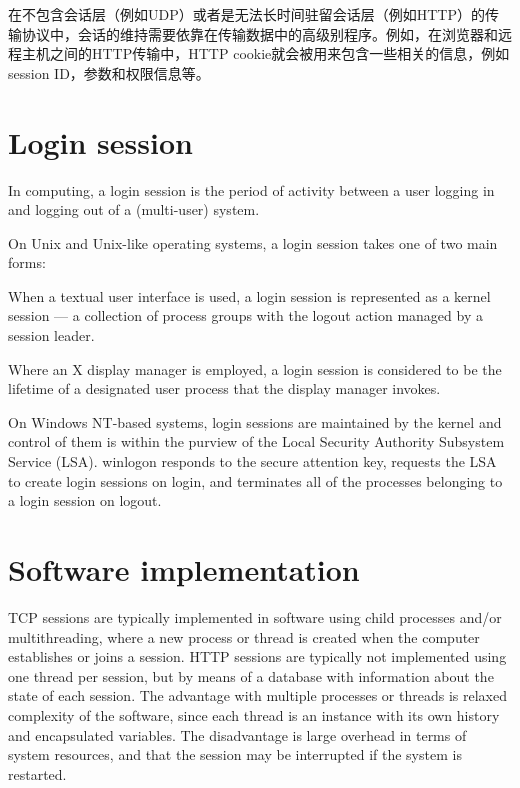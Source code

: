 在不包含会话层（例如UDP）或者是无法长时间驻留会话层（例如HTTP）的传输协议中，会话的维持需要依靠在传输数据中的高级别程序。例如，在浏览器和远程主机之间的HTTP传输中，HTTP cookie就会被用来包含一些相关的信息，例如session ID，参数和权限信息等。



\chapter{Login session}


In computing, a login session is the period of activity between a user logging in and logging out of a (multi-user) system.



On Unix and Unix-like operating systems, a login session takes one of two main forms:



\begin{compactitem}
\item When a textual user interface is used, a login session is represented as a kernel session — a collection of process groups with the logout action managed by a session leader.
\item Where an X display manager is employed, a login session is considered to be the lifetime of a designated user process that the display manager invokes.
\end{compactitem}

On Windows NT-based systems, login sessions are maintained by the kernel and control of them is within the purview of the Local Security Authority Subsystem Service (LSA). winlogon responds to the secure attention key, requests the LSA to create login sessions on login, and terminates all of the processes belonging to a login session on logout.





\chapter{Software implementation}


TCP sessions are typically implemented in software using child processes and/or multithreading, where a new process or thread is created when the computer establishes or joins a session. HTTP sessions are typically not implemented using one thread per session, but by means of a database with information about the state of each session. The advantage with multiple processes or threads is relaxed complexity of the software, since each thread is an instance with its own history and encapsulated variables. The disadvantage is large overhead in terms of system resources, and that the session may be interrupted if the system is restarted.

